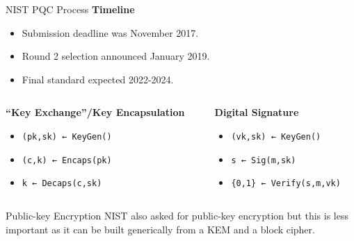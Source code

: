 \documentclass[xcolor=table,10pt,aspectratio=169]{beamer}
\begin{document}
\begin{frame}[label={sec:orgcfffd04},fragile]{NIST PQC {\color{lightgray}{Competition} }Process}
 \textbf{Timeline}

\begin{itemize}
\item Submission deadline was November 2017.
\item Round 2 selection announced January 2019.
\item Final standard expected 2022-2024.
\end{itemize}

\vspace{1em}

\begin{columns}[t]
\begin{column}{0.5\columnwidth}
\textbf{“Key Exchange”/Key Encapsulation}

\begin{itemize}
\item \texttt{(pk,sk) ← KeyGen()}
\item \texttt{(c,k) ← Encaps(pk)}
\item \texttt{k ← Decaps(c,sk)}
\end{itemize}
\end{column}

\begin{column}{0.5\columnwidth}
\textbf{Digital Signature}

\begin{itemize}
\item \texttt{(vk,sk)  ← KeyGen()}
\item \texttt{s  ← Sig(m,sk)}
\item \texttt{\{0,1\}  ← Verify(s,m,vk)}
\end{itemize}
\end{column}
\end{columns}

\vspace{1em}
\pause

\begin{alertblock}{Public-key Encryption}
NIST also asked for public-key encryption but this is less important as it can be built generically from a KEM and a block cipher.
\end{alertblock}
\end{frame}
\end{document}
